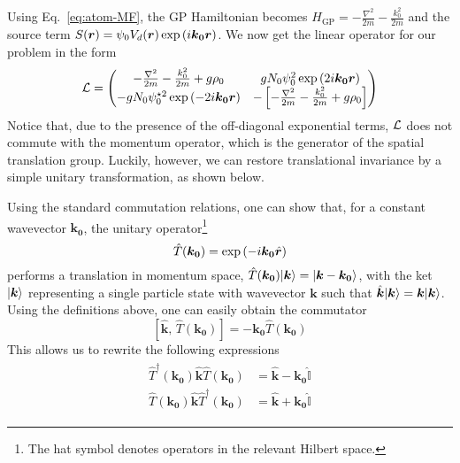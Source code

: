 Using Eq.~\eqref{eq:atom-MF}, the GP Hamiltonian becomes
$H_{\text{GP}} = -\frac{\nabla^2}{2m} - \frac{k_0^2}{2m}$ and the
source term
$S(\bm{r}) = \psi_0 V_d(\bm{r}) \exp \left( i \bm{k_0} \bm{r} \right)$. We now
get the linear operator for our problem in the form
%
\begin{equation}\label{eq:ourL}
  \mathcal{L} = \begin{pmatrix} -\frac{\nabla^2}{2m} - \frac{k_0^2}{2m} + g\rho_0 & g N_0 \psi_0^2 \exp \left( 2 i \bm{k_0} \bm{r} \right)\\ - g N_0 \psi_0^{\star 2} \exp \left( - 2 i \bm{k_0} \bm{r} \right) & -\left[ -\frac{\nabla^2}{2m} - \frac{k_0^2}{2m} + g\rho_0 \right] \end{pmatrix}
\end{equation}
% 
Notice that, due to the presence of the off-diagonal exponential
terms, $\mathcal{L}$ does not commute with the momentum operator, which is
the generator of the spatial translation group. Luckily, however, we
can restore translational invariance by a simple unitary
transformation, as shown below.

Using the standard commutation relations, one can show that, for a
constant wavevector $\bm{k_0}$, the unitary operator\footnote{The hat
  symbol denotes operators in the relevant Hilbert space.}
%
\begin{equation}\label{eq:trans-oper}
  \hat{T}(\bm{k_0}) = \exp \left( -i \bm{k_0} \hat{\bm{r}} \right)
\end{equation}
% 
performs a translation in momentum space,
$\hat{T}(\bm{k_0}) \vert \bm{k} \rangle = \vert \bm{k} - \bm{k_0} \rangle$, with the
ket $\vert \bm{k} \rangle$ representing a single particle state with
wavevector $\bm{k}$ such that
$\hat{\bm{k}} \vert \bm{k} \rangle = \bm{k} \vert \bm{k} \rangle$. Using the
definitions above, one can easily obtain the commutator
%
\begin{equation}\label{eq:trans-commutator}
  \left[ \hat{\bm{k}},\, \hat{T}(\bm{k_0}) \right] = -\bm{k_0}\hat{T}(\bm{k_0}) 
\end{equation}
%
This allows us to rewrite the following expressions
\begin{align}\label{eq:products}
  \begin{split}
    \hat{T}^{\dagger}(\bm{k_0})\hat{\bm{k}}\hat{T}(\bm{k_0})& = \hat{\bm{k}} - \bm{k_0}\hat{\mathbb{I}}\\
    \hat{T}(\bm{k_0})\hat{\bm{k}}\hat{T}^{\dagger}(\bm{k_0})& = \hat{\bm{k}} + \bm{k_0}\hat{\mathbb{I}}  
  \end{split}
\end{align}

